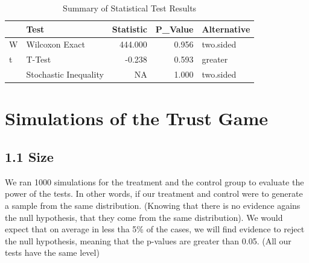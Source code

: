 \documentclass[
]{article}
\begin{document}
\begin{table}

\caption{\label{tab:0}Summary of Statistical Test Results}
\centering
\begin{tabular}[t]{llrrl}
\toprule
  & Test & Statistic & P\_Value & Alternative\\
\midrule
W & Wilcoxon Exact & 444.000 & 0.956 & two.sided\\
t & T-Test & -0.238 & 0.593 & greater\\
 & Stochastic Inequality & NA & 1.000 & two.sided\\
\bottomrule
\end{tabular}
\end{table}

\section{Simulations of the Trust
Game}\label{simulations-of-the-trust-game}

\subsection{1.1 Size}\label{size}

We ran 1000 simulations for the treatment and the control group to
evaluate the power of the tests. In other words, if our treatment and
control were to generate a sample from the same distribution. (Knowing
that there is no evidence agains the null hypothesis, that they come
from the same distribution). We would expect that on average in less tha
5\% of the cases, we will find evidence to reject the null hypothesis,
meaning that the p-values are greater than 0.05. (All our tests have the
same level)
\end{document}
